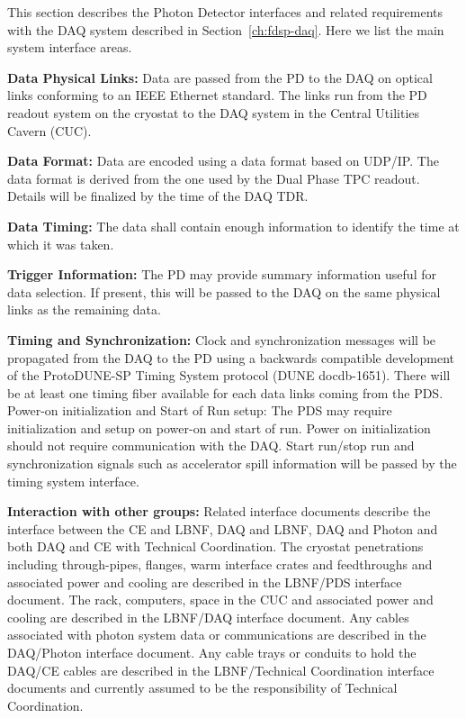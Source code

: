 

This section describes the Photon Detector interfaces and related requirements with the DAQ system described in Section~\ref{ch:fdsp-daq}. Here we list the main system interface areas.


\textbf{Data Physical Links: }Data are passed from the PD to the DAQ on optical links conforming to an IEEE Ethernet standard. The links run from the PD readout system on the cryostat to the DAQ system in the Central Utilities Cavern (CUC).

\textbf{Data Format:} Data are encoded using a data format based on UDP/IP. The data format is derived from the one used by the Dual Phase TPC readout. Details will be finalized by the time of the DAQ TDR.

\textbf{Data Timing:} The data shall contain enough information to identify the time  at which it was taken.

\textbf{Trigger Information:} The PD may provide summary information useful for data selection. If present, this will be passed to the DAQ on the same physical links as the remaining data.

\textbf{Timing and Synchronization: }Clock and synchronization messages will be propagated from the DAQ to the PD using a backwards compatible development of the ProtoDUNE-SP Timing System protocol (DUNE docdb-1651). There will be at least one timing fiber available for each data links coming from the PDS. Power-on initialization and Start of Run setup:  The PDS may require initialization and setup on power-on and start of run. Power on initialization should not require communication with the DAQ. Start run/stop run and synchronization signals such as accelerator spill information will be passed by the timing system interface.

\textbf{Interaction with other groups: }Related interface documents describe the interface between the CE and LBNF, DAQ and LBNF, DAQ and Photon and both DAQ and CE with Technical Coordination. The cryostat penetrations including through-pipes, flanges, warm interface crates and feedthroughs and associated power and cooling are described in the LBNF/PDS interface document.  The rack, computers, space in the CUC and associated power and cooling are described in the LBNF/DAQ interface document. Any cables associated with photon system data or communications are described in the DAQ/Photon interface document. Any cable trays or conduits to hold the DAQ/CE cables are described in the LBNF/Technical Coordination interface documents and currently assumed to be the responsibility of Technical Coordination.

